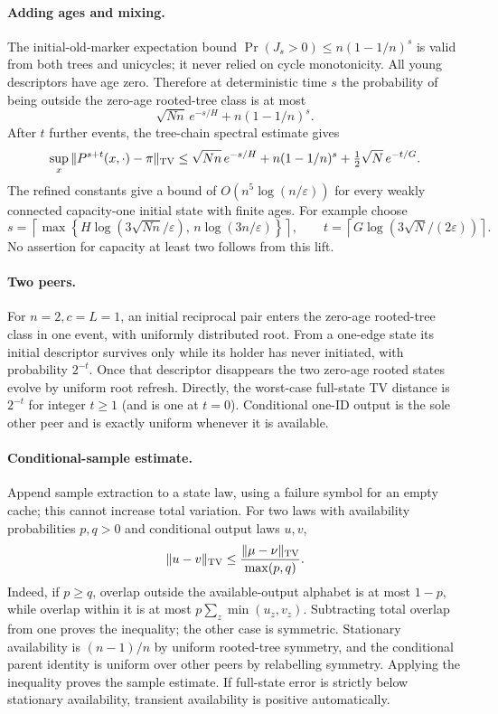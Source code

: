 \documentclass[11pt]{article}
\begin{document}
\paragraph{Adding ages and mixing.}
The initial-old-marker expectation bound
$\Pr(J_s>0)\le n(1-1/n)^s$ is valid from both trees and unicycles;
it never relied on cycle monotonicity. All young descriptors have
age zero. Therefore at deterministic time $s$ the probability of
being outside the zero-age rooted-tree class is at most
\[
 \sqrt{Nn}\,e^{-s/H}+n(1-1/n)^s.
\]
After $t$ further events, the tree-chain spectral estimate gives
\[
 \sup_x\|P^{s+t}(x,\cdot)-\pi\|_{\rm TV}
 \le\sqrt{Nn}\,e^{-s/H}
       +n(1-1/n)^s+\tfrac12\sqrt N\,e^{-t/G}.
\]
The refined constants give a bound of $O(n^5\log(n/\varepsilon))$
for every weakly connected capacity-one initial state with finite ages.
For example choose
\[
 s=\left\lceil\max\left\{
 H\log(3\sqrt{Nn}/\varepsilon),\,
 n\log(3n/\varepsilon)\right\}\right\rceil,
 \qquad
 t=\left\lceil G\log(3\sqrt N/(2\varepsilon))\right\rceil.
\]
No assertion for capacity at least two follows from this lift.

\paragraph{Two peers.}
For $n=2,c=L=1$, an initial reciprocal pair enters the zero-age
rooted-tree class in one event, with uniformly distributed root.
From a one-edge state its initial descriptor survives only while
its holder has never initiated, with probability $2^{-t}$. Once
that descriptor disappears the two zero-age rooted states evolve
by uniform root refresh. Directly, the worst-case full-state TV
distance is $2^{-t}$ for integer $t\ge1$ (and is one at $t=0$).
Conditional one-ID output is the sole other peer and is exactly
uniform whenever it is available.

\paragraph{Conditional-sample estimate.}
Append sample extraction to a state law, using a failure symbol for an
empty cache; this cannot increase total variation. For two laws with
availability probabilities $p,q>0$ and conditional output laws $u,v$,
\[
 \|u-v\|_{\rm TV}\le\frac{\|\mu-\nu\|_{\rm TV}}{\max(p,q)}.
\]
Indeed, if $p\ge q$, overlap outside the available-output alphabet is
at most $1-p$, while overlap within it is at most
$p\sum_z\min(u_z,v_z)$. Subtracting total overlap from one proves the
inequality; the other case is symmetric. Stationary availability is
$(n-1)/n$ by uniform rooted-tree symmetry, and the conditional parent
identity is uniform over other peers by relabelling symmetry. Applying
the inequality proves the sample estimate. If full-state error is
strictly below stationary availability, transient availability is
positive automatically.
\end{document}
